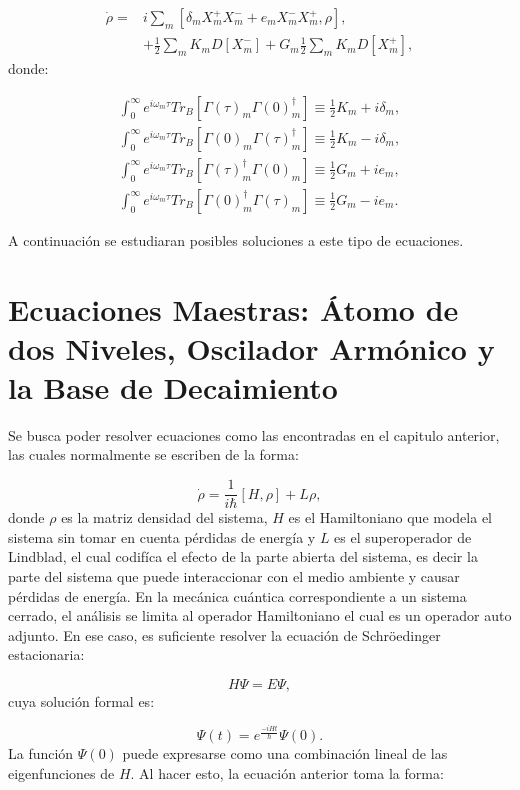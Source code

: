 \documentclass[a4paper,10pt]{report}
\begin{document}
\begin{align}
\dot{\rho} =& i\sum_m [\delta_m X^+_m X^-_m + e_mX^-_mX^+_m,\rho],\\
&+ \nonumber \frac{1}{2}\sum_m K_m D[X^-_m] + G_m\frac{1}{2}\sum_m K_m D[X^+_m],
\end{align} donde:

\begin{align}
\int_0 ^\infty e^{i\omega_m \tau}Tr_B[\Gamma(\tau)_m\Gamma(0)^\dagger_m] \equiv \frac{1}{2}K_m+i\delta_m,\\
\int_0 ^\infty e^{i\omega_m \tau}Tr_B[\Gamma(0)_m\Gamma(\tau)^\dagger_m]\equiv \frac{1}{2}K_m-i\delta_m,\\
\int_0 ^\infty e^{i\omega_m \tau}Tr_B[\Gamma(\tau)^\dagger_m\Gamma(0)_m]\equiv\frac{1}{2}G_m+ie_m,\\
\int_0 ^\infty e^{i\omega_m \tau}Tr_B[\Gamma(0)^\dagger_m\Gamma(\tau)_m]\equiv\frac{1}{2}G_m-ie_m.
\end{align}

A continuación se estudiaran posibles soluciones a este tipo de ecuaciones.


\chapter{Ecuaciones Maestras: Átomo de dos Niveles, Oscilador Armónico y la Base de Decaimiento}

Se busca poder resolver ecuaciones como las encontradas en el capitulo anterior, las cuales normalmente se escriben de la forma:

\begin{equation}\label{MasterEq}
\dot{\rho} = \frac{1}{i\hbar}[H,\rho] + L\rho,
\end{equation} donde $\rho$ es la matriz densidad del sistema, $H$ es el Hamiltoniano que modela el sistema sin tomar en cuenta pérdidas de energía y $L$ es el superoperador de Lindblad, el cual codifíca el efecto de la parte abierta del sistema, es decir la parte del sistema que puede interaccionar con el medio ambiente y causar pérdidas de energía. En la mecánica cuántica correspondiente a un sistema cerrado, el análisis se limita al operador Hamiltoniano el cual es un operador auto adjunto. En ese caso, es suficiente resolver la ecuación de Schröedinger estacionaria:

\begin{equation}
H\Psi = E\Psi,
\end{equation} cuya solución formal es:

\begin{equation}
\Psi(t) = e^{\frac{-iHt}{\hbar}}\Psi(0).
\end{equation} La función $\Psi(0)$ puede expresarse como una  combinación lineal de las eigenfunciones de $H$. Al hacer esto, la ecuación anterior toma la forma:
\end{document}
